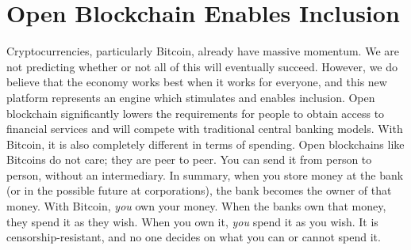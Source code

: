 \section{Open Blockchain Enables Inclusion}
Cryptocurrencies, particularly Bitcoin, already have massive momentum. We are not predicting whether or not all of this will eventually succeed. However, we do believe that the economy works best when it works for everyone, and this new platform represents an engine which stimulates and enables inclusion. Open blockchain significantly lowers the requirements for people to obtain access to financial services and will compete with traditional central banking models. With Bitcoin, it is also completely different in terms of spending. Open blockchains like Bitcoins do not care; they are peer to peer. You can send it from person to person, without an intermediary. 
In summary, when you store money at the bank (or in the possible future at corporations), the bank becomes the owner of that money. With Bitcoin, \emph{you} own your money. When the banks own that money, they spend it as they wish. When you own it, \emph{you} spend it as you wish. It is censorship-resistant, and no one decides on what you can or cannot spend it.\medskip 

